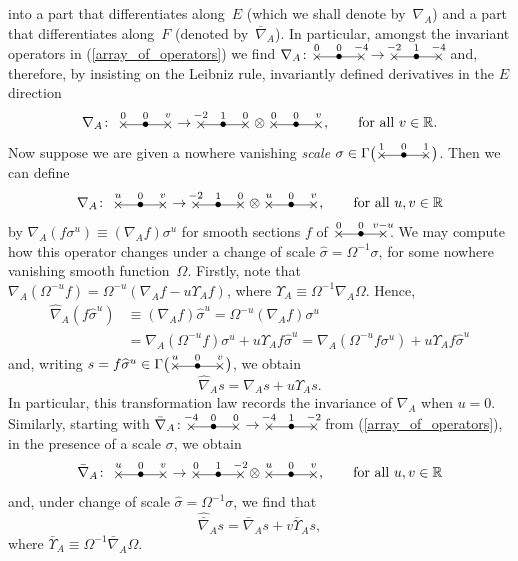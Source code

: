 \documentclass[pdftex]{sigma}%
\numberwithin{equation}{section}
\newcommand{\xox}[3]{\begin{picture}(40,11)
\put(4,1.5){\makebox(0,0){$\times$}}
\put(20,1.5){\makebox(0,0){$\bullet$}}
\put(36,1.5){\makebox(0,0){$\times$}}
\put(4,1.5){\line(1,0){32}}
\put(4,8){\makebox(0,0){$\scriptstyle #1$}}
\put(20,8){\makebox(0,0){$\scriptstyle #2$}}
\put(36,8){\makebox(0,0){$\scriptstyle #3$}}
\end{picture}}
\begin{document}
into a part that differentiates along~$E$ (which we shall denote by~$\nabla_A$)
and a part that differentiates along~$F$ (denoted by~$\bar\nabla_A$). In
particular, amongst the invariant operators in (\ref{array_of_operators}) we
find $\nabla_A\colon \xox{0}{0}{-4}\to\xox{-2}{1}{-4}$ and, therefore, by insisting
on the Leibniz rule, invariantly defined derivatives in the $E$ direction
\[\nabla_A\colon \ \xox{0}{0}{v}\to\xox{-2}{1}{0}\otimes\xox{0}{0}{v},\qquad
\mbox{for all}\ v\in{\mathbb{R}}.\]
Now suppose we are given a nowhere vanishing {\em scale}
$\sigma\in\Gamma\big(\xox{1}{0}{1}\big)$. Then we can define
\begin{align}\label{densities}
\nabla_A\colon \ \xox{u}{0}{v} \to \xox{-2}{1}{0} \otimes \xox{u}{0}{v},\qquad
\mbox{for all}\ u,v\in{\mathbb{R}}
\end{align}
by $\nabla_A(f\sigma^u)\equiv(\nabla_A f)\sigma^u$ for smooth sections $f$ of
$\xox{0}{0}{v-u}$\;. We may compute how this operator changes under a change of
scale $\widehat\sigma=\Omega^{-1}\sigma$, for some nowhere vanishing
smooth function~$\Omega$. Firstly, note that
$\nabla_A(\Omega^{-u}f)=\Omega^{-u}(\nabla_A f-u\Upsilon_Af)$, where
$\Upsilon_A\equiv\Omega^{-1}\nabla_A\Omega$.
Hence,
\begin{align*}
\widehat\nabla_A(f\widehat\sigma^u)& \equiv (\nabla_A f)\widehat\sigma^u=
\Omega^{-u}(\nabla_A f)\sigma^u\\
& = \nabla_A(\Omega^{-u}f)\sigma^u+u\Upsilon_Af\widehat\sigma^u
=\nabla_A(\Omega^{-u}f\sigma^u)+u\Upsilon_Af\widehat\sigma^u
\end{align*}
and, writing $s=f\widehat\sigma^u\in\Gamma\big(\xox{u}{0}{v}\big)$, we obtain
\[\widehat\nabla_A s=\nabla_A s+u\Upsilon_As.\]
In particular, this transformation law records the invariance of $\nabla_A$
when $u=0$. Similarly, starting with
$\bar\nabla_A\colon \xox{-4}{0}{0}\to\xox{-4}{1}{-2}$ from
(\ref{array_of_operators}), in the presence of a scale $\sigma$, we obtain
\[\bar\nabla_A\colon \ \xox{u}{0}{v}\to\xox{0}{1}{-2}\otimes\xox{u}{0}{v},
\qquad\mbox{for all}\ u,v\in{\mathbb{R}}\]
and, under change of scale $\widehat\sigma=\Omega^{-1}\sigma$, we find
that
\[\widehat{\bar\nabla}_As=\bar\nabla_A s+v\bar\Upsilon_As,\]
where $\bar\Upsilon_A\equiv\Omega^{-1}\bar\nabla_A\Omega$.
\end{document}
